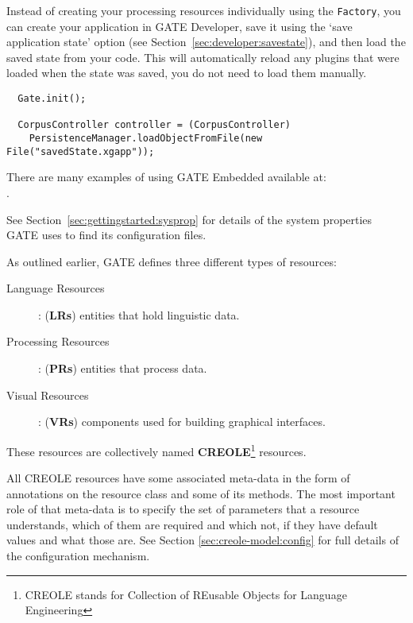%
Instead of creating your processing resources individually using the
\texttt{Factory}, you can create your application in GATE Developer, save it using the
`save application state' option (see
Section~\ref{sec:developer:savestate}), and then load the saved state from
your code.  This will automatically reload any plugins that were
loaded when the state was saved, you do not need to load them
manually.
\begin{lstlisting}
  Gate.init();

  CorpusController controller = (CorpusController)
    PersistenceManager.loadObjectFromFile(new File("savedState.xgapp"));
\end{lstlisting}
There are many examples of using GATE Embedded available at:\\
.


See Section~\ref{sec:gettingstarted:sysprop} for details of the system
properties GATE uses to find its configuration files.

As outlined earlier, GATE defines three different types of resources:
\begin{description}
\item[Language Resources]{: (\textbf{LRs}) entities that hold linguistic data.
}

\item[Processing Resources]{: (\textbf{PRs}) entities that process data.
}

\item[Visual Resources]{: (\textbf{VRs}) components used for building
graphical interfaces. }

\end{description}

These resources are collectively named \textbf{CREOLE}\footnote{CREOLE
stands for Collection of REusable Objects for Language Engineering} resources.

All CREOLE resources have some associated meta-data in the form of annotations
on the resource class and some of its methods.  The most important role of that
meta-data is to specify the set of parameters that a resource understands, which
of them are required and which not, if they have default values and what those
are. See Section \ref{sec:creole-model:config} for full details of the
configuration mechanism.

